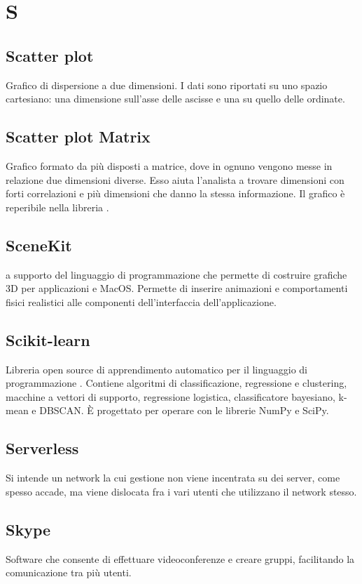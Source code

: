 \section*{S}
\markright{}
\subsection*{Scatter plot}
Grafico di dispersione a due dimensioni. I dati sono riportati su uno spazio cartesiano: una dimensione sull'asse delle ascisse e una su quello delle ordinate. 

\subsection*{Scatter plot Matrix}
Grafico formato da più  disposti a matrice, dove in ognuno vengono messe in relazione due dimensioni diverse. Esso aiuta l'analista a trovare dimensioni con forti correlazioni e più  dimensioni che danno la stessa informazione. Il grafico è reperibile nella libreria .

\subsection*{SceneKit}
 a supporto del linguaggio di programmazione  che permette di costruire grafiche 3D per applicazioni  e MacOS. Permette di inserire animazioni e comportamenti fisici realistici alle componenti dell'interfaccia dell'applicazione. 

\subsection*{Scikit-learn}
Libreria open source di apprendimento automatico per il linguaggio di programmazione . Contiene algoritmi di classificazione, regressione e clustering, macchine a vettori di supporto, regressione logistica, classificatore bayesiano, k-mean e DBSCAN. È progettato per operare con le librerie NumPy e SciPy. 

\subsection*{Serverless}
Si intende un network la cui gestione non viene incentrata su dei server, come spesso accade, ma viene dislocata fra i vari utenti che utilizzano il network stesso.

\subsection*{Skype}
Software che consente di effettuare videoconferenze e creare gruppi, facilitando la comunicazione tra più utenti. 

